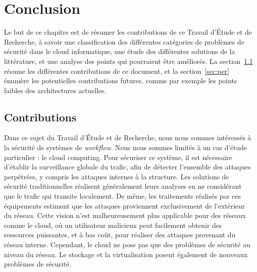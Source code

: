 \begingroup
\renewcommand{\cleardoublepage}{}
\renewcommand{\clearpage}{}
\chapter{Conclusion}
\endgroup

Le but de ce chapitre est de résumer les contributions de ce Travail
d'Étude et de Recherche, à savoir une classification des différentes catégories
de problèmes de sécurité dans le cloud informatique, une étude des différentes
solutions de la littérature, et une analyse des points qui pourraient être
améliorés.
La section~\ref{sec:con} résume les différentes contributions de ce document,
et la section~\ref{sec:per} énumère les potentielles contributions futures,
comme par exemple les points faibles des architectures actuelles.

\section{Contributions}\label{sec:con}

Dans ce sujet du Travail d'Étude et de Recherche, nous nous sommes intéressés à la sécurité de systèmes de \textit{workflow}. Nous nous sommes limités à un cas d'étude particulier : le cloud computing. Pour sécuriser ce système, il est nécessaire d'établir la surveillance globale du trafic, afin de détecter l’ensemble des attaques perpétrées, y compris les attaques internes à la structure. Les solutions de sécurité traditionnelles
réalisent généralement leurs analyses en ne considérant que le trafic qui transite localement.
De même, les traitements réalisés par ces équipements estiment que les attaques proviennent exclusivement de l’extérieur du réseau. Cette vision n’est malheureusement plus applicable pour
des réseaux comme le cloud, où un utilisateur malicieux peut facilement obtenir des ressources puissantes, et à bas coût, pour réaliser des attaques provenant du réseau interne. Cependant, le cloud ne pose pas que des problèmes de sécurité au niveau du réseau. Le stockage et la virtualisation posent également de nouveaux problèmes de sécurité.

